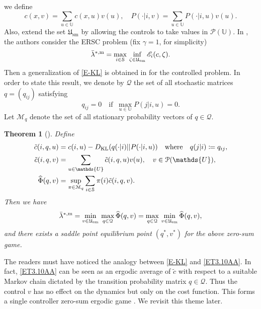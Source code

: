 \documentclass[notitlepage,11pt,reqno]{amsart}
\numberwithin{equation}{section}
\theoremstyle{plain}
\newtheorem{theorem}{Theorem}[section]
\theoremstyle{definition}
\theoremstyle{remark}
\newcommand{\Act}{{\mathds{U}}}
\newcommand{\sE}{{\mathscr{E}}}     %
\newcommand{\Pm}{{\mathcal{P}}}     %
\newcommand{\cS}{{\mathcal{S}}}     %
\newcommand{\Usm}{\mathfrak{U}_{\mathrm{sm}}}
\newcommand{\df}{\coloneqq}
\begin{document}
we define
$$c(x, v)=\sum_{u\in\Act} c(x, u) v(u),
\quad P(\cdot|i, v)=\sum_{u\in\Act} P(\cdot|i, u)v(u).$$
Also, extend the set $\Usm$ by allowing the controls to take values in
$\Pm(\Act)$. In \cite{9683319}, the authors consider the ERSC problem
(fix $\gamma=1$, for simplicity)
$$\bar\lambda^{*, {\rm m}}=\max_{i\in\cS}\, \inf_{\zeta\in\Usm}\sE_i(c, \zeta).$$
Then a generalization of \eqref{E-KL} is obtained in \cite{9683319} for the controlled problem. In order to state this result, we denote by $\mathcal{Q}$ the 
set of all stochastic matrices $q=(q_{ij})$ satisfying
$$q_{ij}=0\quad \text{if}\;\; \max_{u\in\Act}P(j|i,u)=0.$$
Let $\mathcal{M}_q$ denote the set of all stationary probability
vectors of $q\in\mathcal{Q}$.
\begin{theorem}[\cite{9683319}]\label{T3.10A}
Define
\begin{align}\label{ET3.10AA}
\tilde{c}(i, q, u)&= c(i, u)-D_{\rm KL}(q(\cdot|i)||P(\cdot|i, u))
\quad \text{where}\quad q(j|i)\df q_{ij},\nonumber
\\
\tilde{c}(i, q, v)&=\sum_{u\in\Act} \tilde{c}(i, q, u) v(u),\quad v\in\Pm(\Act),\nonumber
\\
\widehat\Phi(q, v)&=\sup_{\pi\in\mathcal{M}_q}\sum_{i\in\cS}\pi(i)\tilde{c}(i, q, v). 
\end{align}
Then we have
$$\bar\lambda^{*, {\rm m}}=\min_{v\in\Usm}\, \max_{q\in\mathcal{Q}}\widehat\Phi(q, v)=\max_{q\in\mathcal{Q}}\, \min_{v\in\Usm}\widehat\Phi(q,v),$$
and there exists  a saddle point equilibrium point $(q^*, v^*)$ for the above zero-sum game.
\end{theorem}
The readers must have noticed the analogy between \eqref{E-KL} and
\eqref{ET3.10AA}. In fact, \eqref{ET3.10AA} can be seen as an ergodic 
average of $\tilde{c}$ with respect to a 
suitable Markov chain dictated by the
transition probability matrix $q\in\mathcal{Q}$. Thus the control $v$
has no effect on the dynamics but only on the cost function. 
This forms a single controller zero-sum ergodic game \cite{FR}. We revisit this theme later.
\end{document}
